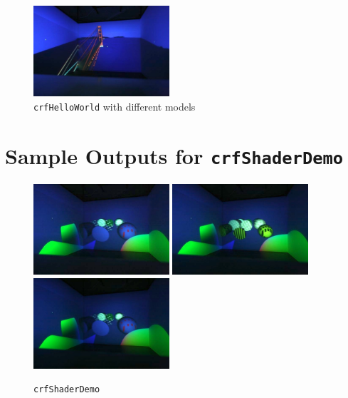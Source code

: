 \begin{figure}[H]
	\includegraphics[width=0.45\textwidth]{../figures/fotos/demo_blender10}
	\caption{\texttt{crfHelloWorld} with different models}
\end{figure}

\section{Sample Outputs for \texttt{crfShaderDemo}}
\begin{figure}[H]
	\centering
	\includegraphics[width=0.45\textwidth]{../figures/fotos/demo_shader}
	\includegraphics[width=0.45\textwidth]{../figures/fotos/demo_shader2}
	\includegraphics[width=0.45\textwidth]{../figures/fotos/demo_shader3}
	\caption{\texttt{crfShaderDemo}}
\end{figure}

